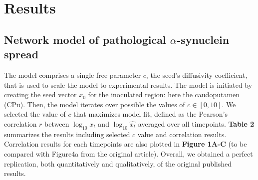 \section{Results}
\subsection{Network model of pathological $\alpha$-synuclein spread}
The model comprises a single free parameter $c$, the seed's diffusivity coefficient, that is used to scale the model to experimental results. The model is initiated by creating the seed vector $x_{0}$ for the inoculated region: here the caudoputamen (CPu). Then, the model iterates over possible the values of $c \in [0, 10]$. We selected the value of $c$ that maximizes model fit, defined as the Pearson's correlation $r$ between $\log_{10}x_{t}$ and $\log_{10}\widehat{x_{t}}$ averaged over all timepoints. \textbf{Table 2} summarizes the results including selected $c$ value and correlation results. Correlation results for each timepoints are also plotted in \textbf{Figure 1A-C} (to be compared with Figure4a from the original article). Overall, we obtained a perfect replication, both quantitatively and qualitatively, of the original published results.\\

